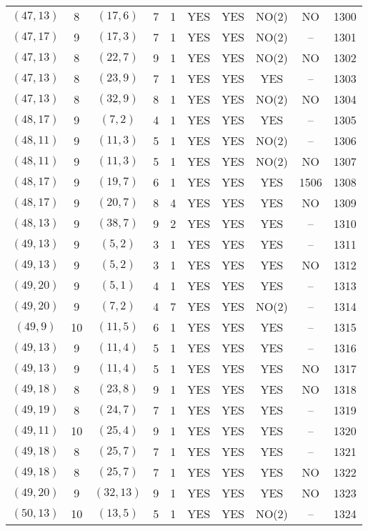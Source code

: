 \begin{longtable}{|c|c|c|c|c|c|c|c|c|c|}
$(47, 13)$ & 8 & $(17, 6)$ & 7 & 1 & YES & YES & NO(2) & NO & 1300\\
$(47, 17)$ & 9 & $(17, 3)$ & 7 & 1 & YES & YES & NO(2) & -- & 1301\\
$(47, 13)$ & 8 & $(22, 7)$ & 9 & 1 & YES & YES & NO(2) & NO & 1302\\
$(47, 13)$ & 8 & $(23, 9)$ & 7 & 1 & YES & YES & YES & -- & 1303\\
$(47, 13)$ & 8 & $(32, 9)$ & 8 & 1 & YES & YES & NO(2) & NO & 1304\\
$(48, 17)$ & 9 & $(7, 2)$ & 4 & 1 & YES & YES & YES & -- & 1305\\
$(48, 11)$ & 9 & $(11, 3)$ & 5 & 1 & YES & YES & NO(2) & -- & 1306\\
$(48, 11)$ & 9 & $(11, 3)$ & 5 & 1 & YES & YES & NO(2) & NO & 1307\\
$(48, 17)$ & 9 & $(19, 7)$ & 6 & 1 & YES & YES & YES & 1506 & 1308\\
$(48, 17)$ & 9 & $(20, 7)$ & 8 & 4 & YES & YES & YES & NO & 1309\\
$(48, 13)$ & 9 & $(38, 7)$ & 9 & 2 & YES & YES & YES & -- & 1310\\
$(49, 13)$ & 9 & $(5, 2)$ & 3 & 1 & YES & YES & YES & -- & 1311\\
$(49, 13)$ & 9 & $(5, 2)$ & 3 & 1 & YES & YES & YES & NO & 1312\\
$(49, 20)$ & 9 & $(5, 1)$ & 4 & 1 & YES & YES & YES & -- & 1313\\
$(49, 20)$ & 9 & $(7, 2)$ & 4 & 7 & YES & YES & NO(2) & -- & 1314\\
$(49, 9)$ & 10 & $(11, 5)$ & 6 & 1 & YES & YES & YES & -- & 1315\\
$(49, 13)$ & 9 & $(11, 4)$ & 5 & 1 & YES & YES & YES & -- & 1316\\
$(49, 13)$ & 9 & $(11, 4)$ & 5 & 1 & YES & YES & YES & NO & 1317\\
$(49, 18)$ & 8 & $(23, 8)$ & 9 & 1 & YES & YES & YES & NO & 1318\\
$(49, 19)$ & 8 & $(24, 7)$ & 7 & 1 & YES & YES & YES & -- & 1319\\
$(49, 11)$ & 10 & $(25, 4)$ & 9 & 1 & YES & YES & YES & -- & 1320\\
$(49, 18)$ & 8 & $(25, 7)$ & 7 & 1 & YES & YES & YES & -- & 1321\\
$(49, 18)$ & 8 & $(25, 7)$ & 7 & 1 & YES & YES & YES & NO & 1322\\
$(49, 20)$ & 9 & $(32, 13)$ & 9 & 1 & YES & YES & YES & NO & 1323\\
$(50, 13)$ & 10 & $(13, 5)$ & 5 & 1 & YES & YES & NO(2) & -- & 1324\\

\end{longtable}
